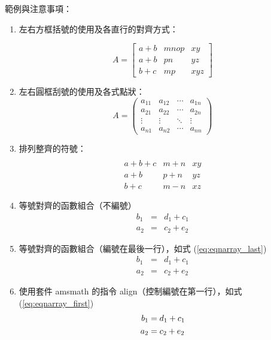 \documentclass[12pt, a4paper]{article}
\begin{document}
範例與注意事項：
\begin{enumerate}
  \item 左右方框括號的使用及各直行的對齊方式：
 
        $$ A = \left[
            \begin{array}{clr}
                a+b & mnop  & xy \\
                a+b & pn    & yz \\
                b+c & mp    & xyz
            \end{array} \right] $$

  \item 左右圓框刮號的使用及各式點狀：
        $$ A=\left(
            \begin{array}{cccc}
                a_{11} 	& a_{12} & \cdots 	& a_{1n}\\
                a_{21} 	& a_{22} & \cdots 	& a_{2n}\\
                \vdots 	& \vdots & \ddots	& \vdots\\
                a_{n1} 	& a_{n2} & \cdots 	& a_{nn}
            \end{array} \right) $$

  \item 排列整齊的符號：
        $$ \begin{array}{clr}\\
            a+b+c   & m+n 	& xy \\
            a+b     & p+n 	& yz \\
            b+c     & m-n 	& xz
        \end{array} $$

    \item 等號對齊的函數組合（不編號）
        \begin{eqnarray*}
          b_1 &=& d_1+c_1 \\
          a_2 &=& c_2+e_2
        \end{eqnarray*}

    \item 等號對齊的函數組合（編號在最後一行），如式 (\ref{eq:eqnarray_last})
        \begin{eqnarray}\label{eq:eqnarray_last}
\nonumber b_1 &=& d_1+c_1 \\
          a_2 &=& c_2+e_2
        \end{eqnarray}

    \item 使用套件 {\A amsmath} 的指令 {\A align}（控制編號在第一行），如式 (\ref{eq:eqnarray_first})
        \begin{align} 
            b_1 &= d_1+c_1 \label{eq:eqnarray_first}\\
            a_2 &= c_2+e_2 \notag
        \end{align}


\end{enumerate}
\end{document}
